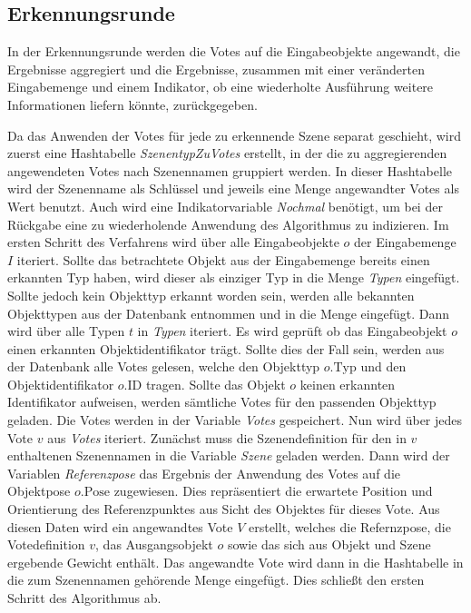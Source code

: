 \subsection{Erkennungsrunde}

In der Erkennungsrunde werden die Votes auf die Eingabeobjekte angewandt, die Ergebnisse aggregiert und die Ergebnisse, zusammen mit einer veränderten Eingabemenge und einem Indikator, ob eine wiederholte Ausführung weitere Informationen liefern könnte, zurückgegeben.

Da das Anwenden der Votes für jede zu erkennende Szene separat geschieht, wird zuerst eine Hashtabelle \textit{SzenentypZuVotes} erstellt, in der die zu aggregierenden angewendeten Votes nach Szenennamen gruppiert werden.
In dieser Hashtabelle wird der Szenenname als Schlüssel und jeweils eine Menge angewandter Votes als Wert benutzt.
Auch wird eine Indikatorvariable \textit{Nochmal} benötigt, um bei der Rückgabe eine zu wiederholende Anwendung des Algorithmus zu indizieren.
Im ersten Schritt des Verfahrens wird über alle Eingabeobjekte $o$ der Eingabemenge $I$ iteriert.
Sollte das betrachtete Objekt aus der Eingabemenge bereits einen erkannten Typ haben, wird dieser als einziger Typ in die Menge \textit{Typen} eingefügt.
Sollte jedoch kein Objekttyp erkannt worden sein, werden alle bekannten Objekttypen aus der Datenbank entnommen und in die Menge eingefügt.
Dann wird über alle Typen $t$ in \textit{Typen} iteriert.
Es wird geprüft ob das Eingabeobjekt $o$ einen erkannten Objektidentifikator trägt.
Sollte dies der Fall sein, werden aus der Datenbank alle Votes gelesen, welche den Objekttyp $o.\text{Typ}$ und den Objektidentifikator $o.\text{ID}$ tragen.
Sollte das Objekt $o$ keinen erkannten Identifikator aufweisen, werden sämtliche Votes für den passenden Objekttyp geladen.
Die Votes werden in der Variable \textit{Votes} gespeichert.
Nun wird über jedes Vote $v$ aus \textit{Votes} iteriert.
Zunächst muss die Szenendefinition für den in $v$ enthaltenen Szenennamen in die Variable \textit{Szene} geladen werden.
Dann wird der Variablen \textit{Referenzpose} das Ergebnis der Anwendung des Votes auf die Objektpose $o.\text{Pose}$ zugewiesen.
Dies repräsentiert die erwartete Position und Orientierung des Referenzpunktes aus Sicht des Objektes für dieses Vote.
Aus diesen Daten wird ein angewandtes Vote $V$ erstellt, welches die Refernzpose, die Votedefinition $v$, das Ausgangsobjekt $o$ sowie das sich aus Objekt und Szene ergebende Gewicht enthält.
Das angewandte Vote wird dann in die Hashtabelle in die zum Szenennamen gehörende Menge eingefügt.
Dies schließt den ersten Schritt des Algorithmus ab.

